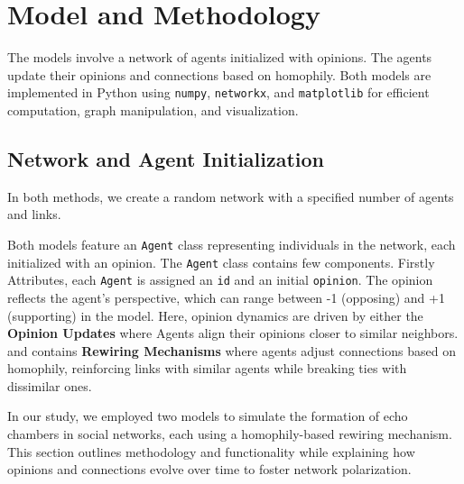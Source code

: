 \documentclass{article} %
\begin{document}
\section{Model and Methodology}
The models involve a network of agents initialized with opinions. The agents update their opinions and connections based on homophily. Both models are implemented in Python using \texttt{numpy}, \texttt{networkx}, and \texttt{matplotlib} for efficient computation, graph manipulation, and visualization.

\subsection{Network and Agent Initialization}
In both methods, we create a random network with a specified number of agents and links.

Both models feature an \texttt{Agent} class representing individuals in the network, each initialized with an opinion. The \texttt{Agent} class contains few components. Firstly 
Attributes,  each \texttt{Agent} is assigned an \texttt{id} and an initial \texttt{opinion}. The opinion reflects the agent’s perspective, which can range between -1 (opposing) and +1 (supporting) in the model. Here, opinion dynamics are driven by either the \textbf{Opinion Updates} where Agents align their opinions closer to similar neighbors. and contains \textbf{Rewiring Mechanisms} where agents adjust connections based on homophily, reinforcing links with similar agents while breaking ties with dissimilar ones.

In our study, we employed two models to simulate the formation of echo chambers in social networks, each using a homophily-based rewiring mechanism. This section outlines methodology and functionality while explaining how opinions and connections evolve over time to foster network polarization.
\end{document}
